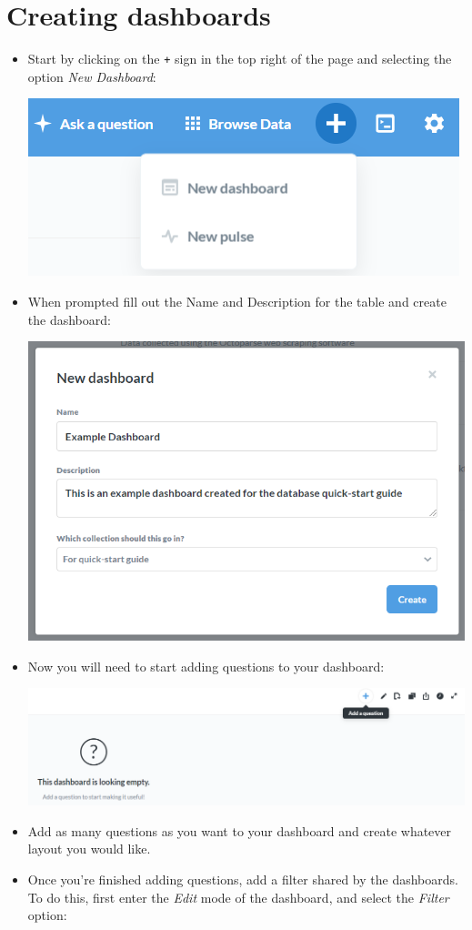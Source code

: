\documentclass[
]{book}
\begin{document}
\hypertarget{creating-dashboards}{%
\section{Creating dashboards}\label{creating-dashboards}}

\begin{itemize}
\item
  Start by clicking on the \texttt{+} sign in the top right of the page and selecting the option \emph{New Dashboard}:

  \includegraphics{images/CreateDashboard.png}
\item
  When prompted fill out the Name and Description for the table and create the dashboard:

  \includegraphics{images/NewDashboard.png}
\item
  Now you will need to start adding questions to your dashboard:

  \includegraphics{images/DashboardAddQuestion.png}
\item
  Add as many questions as you want to your dashboard and create whatever layout you would like.
\item
  Once you're finished adding questions, add a filter shared by the dashboards. To do this, first enter the \emph{Edit} mode of the dashboard, and select the \emph{Filter} option:


\end{itemize}
\end{document}
